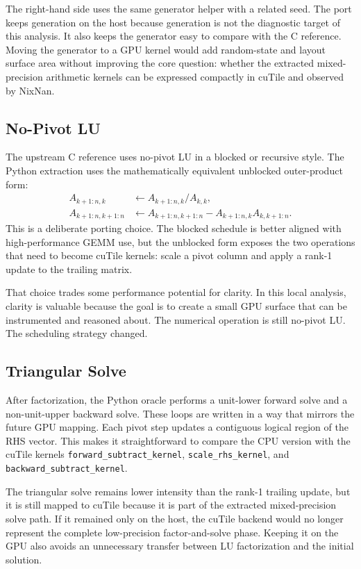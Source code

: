\documentclass[11pt]{article}
\newcommand{\cutile}{cuTile}
\newcommand{\nixnan}{NixNan}
\newcommand{\code}[1]{\texttt{#1}}
\begin{document}
The right-hand side uses the same generator helper with a related seed. The
port keeps generation on the host because generation is not the diagnostic
target of this analysis. It also keeps the generator easy to compare with the
C reference. Moving the generator to a GPU kernel would add random-state and
layout surface area without improving the core question: whether the extracted
mixed-precision arithmetic kernels can be expressed compactly in \cutile{} and
observed by \nixnan{}.

\subsection{No-Pivot LU}

The upstream C reference uses no-pivot LU in a blocked or recursive style. The
Python extraction uses the mathematically equivalent unblocked outer-product
form:
\[
\begin{aligned}
  A_{k+1:n,k} &\leftarrow A_{k+1:n,k}/A_{k,k}, \\
  A_{k+1:n,k+1:n} &\leftarrow A_{k+1:n,k+1:n}
    - A_{k+1:n,k} A_{k,k+1:n}.
\end{aligned}
\]
This is a deliberate porting choice. The blocked schedule is better aligned
with high-performance GEMM use, but the unblocked form exposes the two
operations that need to become \cutile{} kernels: scale a pivot column and
apply a rank-1 update to the trailing matrix.

That choice trades some performance potential for clarity. In this local
analysis, clarity is valuable because the goal is to create a small GPU
surface that can be instrumented and reasoned about. The numerical operation
is still no-pivot LU. The scheduling strategy changed.

\subsection{Triangular Solve}

After factorization, the Python oracle performs a unit-lower forward solve and
a non-unit-upper backward solve. These loops are written in a way that mirrors
the future GPU mapping. Each pivot step updates a contiguous logical region of
the RHS vector. This makes it straightforward to compare the CPU version with
the \cutile{} kernels \code{forward\_subtract\_kernel},
\code{scale\_rhs\_kernel}, and \code{backward\_subtract\_kernel}.

The triangular solve remains lower intensity than the rank-1 trailing update,
but it is still mapped to \cutile{} because it is part of the extracted
mixed-precision solve path. If it remained only on the host, the \cutile{}
backend would no longer represent the complete low-precision factor-and-solve
phase. Keeping it on the GPU also avoids an unnecessary transfer between LU
factorization and the initial solution.
\end{document}

